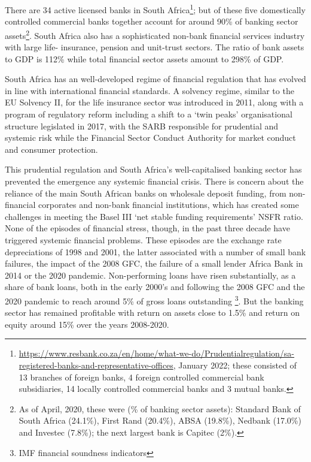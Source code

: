 \documentclass[
  12,
]{article}
\begin{document}
There are 34 active licensed banks in South Africa\footnote{\url{https://www.resbank.co.za/en/home/what-we-do/Prudentialregulation/sa-registered-banks-and-representative-offices}, January 2022; these consisted of 13 branches of foreign banks, 4 foreign controlled commercial bank subsidiaries, 14 locally controlled commercial banks and 3 mutual banks.}; but of these five domestically controlled commercial banks together account for around 90\% of banking sector assets\footnote{As of April, 2020, these were (\% of banking sector assets): Standard Bank of South Africa (24.1\%), First Rand (20.4\%), ABSA (19.8\%), Nedbank (17.0\%) and Investec (7.8\%); the next largest bank is Capitec (2\%).}. South Africa also has a sophisticated non-bank financial services industry with large life- insurance, pension and unit-trust sectors. The ratio of bank assets to GDP is 112\% while total financial sector assets amount to 298\% of GDP.

South Africa has an well-developed regime of financial regulation that has evolved in line with international financial standards. A solvency regime, similar to the EU Solvency II, for the life insurance sector was introduced in 2011, along with a program of regulatory reform including a shift to a `twin peaks' organisational structure legislated in 2017, with the SARB responsible for prudential and systemic risk while the Financial Sector Conduct Authority for market conduct and consumer protection.

This prudential regulation and South Africa's well-capitalised banking sector has prevented the emergence any systemic financial crisis. There is concern about the reliance of the main South African banks on wholesale deposit funding, from non-financial corporates and non-bank financial institutions, which has created some challenges in meeting the Basel III `net stable funding requirements' NSFR ratio. None of the episodes of financial stress, though, in the past three decade have triggered systemic financial problems. These episodes are the exchange rate depreciations of 1998 and 2001, the latter associated with a number of small bank failures, the impact of the 2008 GFC, the failure of a small lender Africa Bank in 2014 or the 2020 pandemic. Non-performing loans have risen substantially, as a share of bank loans, both in the early 2000's and following the 2008 GFC and the 2020 pandemic to reach around 5\% of gross loans outstanding \footnote{IMF financial soundness indicators}. But the banking sector has remained profitable with return on assets close to 1.5\% and return on equity around 15\% over the years 2008-2020.
\end{document}

